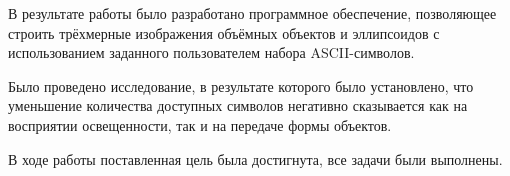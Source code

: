 
В результате работы было разработано программное обеспечение, позволяющее строить трёхмерные изображения объёмных объектов и эллипсоидов с использованием заданного пользователем набора ASCII-символов.

Было проведено исследование, в результате которого было установлено, что уменьшение количества доступных символов негативно сказывается как на восприятии освещенности, так и на передаче формы объектов.

В ходе работы поставленная цель была достигнута, все задачи были выполнены.